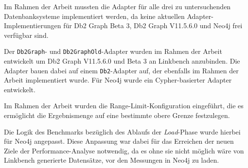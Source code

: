 Im Rahmen der Arbeit mussten die Adapter für alle drei zu untersuchenden Datenbanksysteme implementiert werden, da keine aktuellen Adapter-Implementierungen für Db2 Graph Beta 3, Db2 Graph V11.5.6.0 und Neo4j frei verfügbar sind.

Der \texttt{Db2Graph}- und \texttt{Db2GraphOld}-Adapter wurden im Rahmen der Arbeit entwickelt um Db2 Graph V11.5.6.0 und Beta 3 an Linkbench anzubinden. Die Adapter bauen dabei auf einem \texttt{Db2}-Adapter auf, der ebenfalls im Rahmen der Arbeit implementiert wurde. Für Neo4j wurde ein Cypher-basierter Adapter entwickelt. 

Im Rahmen der Arbeit wurden die Range-Limit-Konfiguration eingeführt, die es ermöglicht die Ergebnismenge auf eine bestimmte obere Grenze festzulegen. 

Die Logik des Benchmarks bezüglich des Ablaufs der \textit{Load}-Phase wurde hierbei für Neo4j angepasst. Diese Anpassung war dabei für das Erreichen der neuen Ziele der Performance-Analyse notwendig, da es ohne sie nicht möglich wäre von Linkbench generierte Datensätze, vor den Messungen in Neo4j zu laden. 